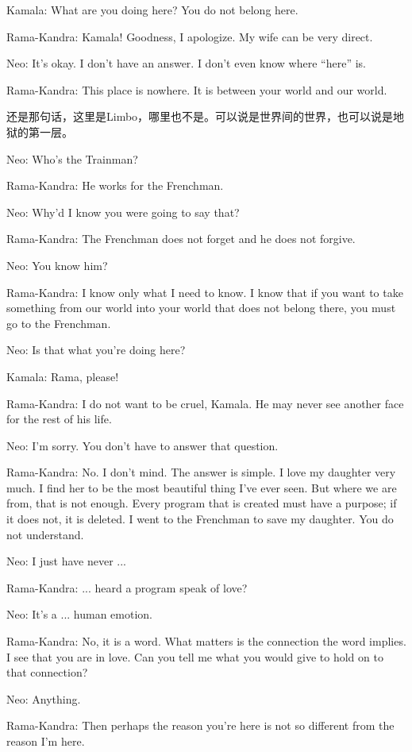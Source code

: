 \documentclass[UTF8]{ctexart}
\newenvironment{myquote}{\color{green} \setlength{\leftskip}{6em} \setlength{\rightskip}{4em} \setlength{\parindent}{-2em}}{\par}
\begin{document}
\begin{myquote}
Kamala: What are you doing here? You do not belong here.

Rama-Kandra: Kamala! Goodness, I apologize. My wife can be very direct.

Neo: It's okay. I don't have an answer. I don't even know where ``here'' is.

Rama-Kandra: This place is nowhere. It is between your world and our world.
\end{myquote}

还是那句话，这里是Limbo，哪里也不是。可以说是世界间的世界，也可以说是地狱的第一层。

\begin{myquote}
Neo: Who's the Trainman?

Rama-Kandra: He works for the Frenchman.

Neo: Why'd I know you were going to say that?

Rama-Kandra: The Frenchman does not forget and he does not forgive.

Neo: You know him?

Rama-Kandra: I know only what I need to know. I know that if you want to take something from our world into your world that does not belong there, you must go to the Frenchman.

Neo: Is that what you're doing here?

Kamala: Rama, please!

Rama-Kandra: I do not want to be cruel, Kamala. He may never see another face for the rest of his life.

Neo: I'm sorry. You don't have to answer that question.

Rama-Kandra: No. I don't mind. The answer is simple. I love my daughter very much. I find her to be the most beautiful thing I've ever seen. But where we are from, that is not enough. Every program that is created must have a purpose; if it does not, it is deleted. I went to the Frenchman to save my daughter. You do not understand.

Neo: I just have never ...

Rama-Kandra: ... heard a program speak of love?

Neo: It's a ... human emotion.

Rama-Kandra: No, it is a word. What matters is the connection the word implies. I see that you are in love. Can you tell me what you would give to hold on to that connection?

Neo: Anything.

Rama-Kandra: Then perhaps the reason you're here is not so different from the reason I'm here.
\end{myquote}
\end{document}
